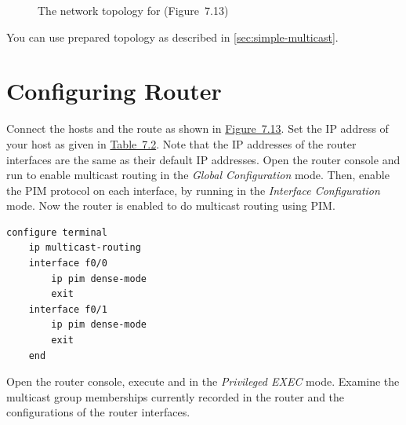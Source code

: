 \documentclass{../UTNetLab}
\begin{document}
\begin{figure}[H]
    \centering
    \caption{The network topology for  (Figure~7.13)}
    \label{fig:7.13}
\end{figure}

You can use prepared topology as described in \autoref{sec:simple-multicast}.

\section{Configuring Router}
\label{sec:config-router}
Connect the hosts and the route as shown in \hyperref[fig:7.13]{Figure~7.13}.
Set the IP address of your host as given in \hyperref[tab:7.2]{Table~7.2}.
Note that the IP addresses of the router interfaces are the same as their default IP addresses.
Open the router console and run  to enable multicast routing in the \textit{Global Configuration} mode.
Then, enable the PIM protocol on each interface, by running  in the \textit{Interface Configuration} mode.
Now the router is enabled to do multicast routing using PIM.

\begin{lstlisting}[language=cisco]
configure terminal
    ip multicast-routing
    interface f0/0
        ip pim dense-mode
        exit
    interface f0/1
        ip pim dense-mode
        exit
    end
\end{lstlisting}

Open the router console, execute  and  in the \textit{Privileged EXEC} mode.
Examine the multicast group memberships currently recorded in the router and the configurations of the router interfaces.
\end{document}

